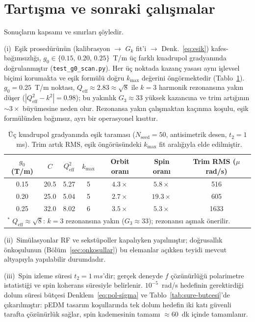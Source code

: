 \documentclass[preprint,12pt]{elsarticle}
\begin{document}
\section{Tartışma ve sonraki çalışmalar}
\label{sec:tartisma}

Sonuçların kapsamı ve sınırları şöyledir.

(i)~Eşik prosedürünün (kalibrasyon $\to$ $G_k$ fit'i $\to$
Denk.~\ref{eq:esik}) kafes-bağımsızlığı, $g_0\in\{0.15,\,0.20,\,0.25\}$~T/m
üç farklı kuadrupol gradyanında doğrulanmıştır (\texttt{test\_g0\_scan.py}).
Her üç noktada kazanç yasası aynı işlevsel biçimi korumakta ve eşik
formülü doğru $k_\mathrm{max}$ değerini öngörmektedir (Tablo~\ref{tab:g0scan}).
$g_0=0.25$~T/m noktası, $Q_\mathrm{eff}\approx2.83\approx\sqrt{8}$ ile
$k=3$ harmonik rezonansına yakın düşer ($|Q_\mathrm{eff}^2-k^2|=0.98$);
bu yakınlık $G_3\approx33$ yüksek kazancına ve trim artığının $\sim3\times$
büyümesine neden olur. Rezonansa yakın çalışmaktan kaçınma koşulu,
eşik formülünden bağımsız, ayrı bir operasyonel kısıttır.

\begin{table}[htb]
\centering
\caption{Üç kuadrupol gradyanında eşik taraması ($N_\mathrm{seed}=50$,
antisimetrik desen, $t_2=1$~ms). Trim artık RMS, eşik öngörüsündeki
$k_\mathrm{max}$ fit aralığıyla elde edilmiştir.}
\label{tab:g0scan}
\begin{tabular}{ccccccc}
\toprule
$g_0$ (T/m) & $C$ & $Q_\mathrm{eff}^2$ & $k_\mathrm{max}$ &
Orbit oranı & Spin oranı & Trim RMS ($\mu$rad/s) \\
\midrule
0.15 & 20.5 & 5.27 & 5 & $4.3\times$ & $5.8\times$  & 516 \\
0.20 & 25.0 & 5.04 & 5 & $2.7\times$ & $19.3\times$ & 605 \\
0.25 & 32.0 & 8.02 & 6 & $3.5\times$ & $5.3\times$  & 1633\rlap{${}^*$} \\
\bottomrule
\multicolumn{7}{l}{\small ${}^*$ $Q_\mathrm{eff}\approx\sqrt{8}$:
$k=3$ rezonansına yakın ($G_3\approx33$); rezonansı aşmak önerilir.}
\end{tabular}
\end{table}

(ii)~Simülasyonlar RF ve sekstüpoller kapalıyken yapılmıştır;
doğrusallık önkoşulunun (Bölüm~\ref{sec:onkosullar}) bu elemanlar
açıkken teyidi mevcut altyapıyla yapılabilir durumdadır.

(iii)~Spin izleme süresi $t_2=\SI{1}{ms}$'dir; gerçek deneyde
$f$ çözünürlüğü polarimetre istatistiği ve spin koherans süresiyle
belirlenir. $10^{-5}$~rad/s hedefinin gerektirdiği dolum süresi bütçesi
Denklem~\ref{eq:pol-sigma} ve Tablo~\ref{tab:sure-butcesi}'de
çıkarılmıştır: pEDM tasarım koşullarında tek dolum hedefin iki katı
güvenli tarafta çözünürlük sağlar, spin kademesinin tamamı
$\approx60$~dk içinde tamamlanır.
\end{document}
